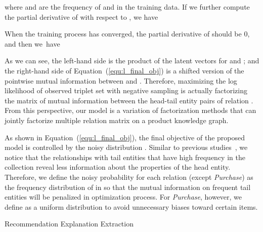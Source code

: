 \documentclass[algorithms,article,accept,moreauthors,pdftex,10pt,a4paper]{Definitions/mdpi}
\begin{document}
where  and  are the frequency of  and  in the training data.
If we further compute the partial derivative of  with respect to , we have


When the training process has converged, the partial derivative of  should be 0, and then we~have


As we can see, the left-hand side  is the product of the latent vectors for  and ; and the right-hand side of Equation~(\ref{equ:l_final_obj}) is a shifted version of the pointwise mutual information between  and .
Therefore, maximizing the log likelihood of observed triplet set  with negative sampling is actually factorizing the matrix of mutual information between the head-tail entity pairs  of relation .
From this perspective, our model is a variation of factorization methods that can jointly factorize multiple relation matrix on a product knowledge graph.


As shown in Equation~(\ref{equ:l_final_obj}), the final objective of the proposed model is controlled by the noisy distribution .
Similar to previous studies~\cite{mikolov2013efficient,le2014distributed,ai2016analysis}, we notice that the relationships with tail entities that have high frequency in the collection reveal less information about the properties of the head entity.
Therefore, we define the noisy probability  for each relation  (except \textit{Purchase}) as the frequency distribution of  in  so that the mutual information on frequent tail entities will be penalized in optimization process.
For \textit{Purchase}, however, we define  as a uniform distribution to avoid unnecessary biases toward certain items.\vspace{12 pt}

\begin{algorithm}[H]
	\small
	\caption{Recommendation Explanation Extraction}
	\SetAlgoLined
	\label{alg:REE}
	 
	\KwOut{}
\end{algorithm}
\end{document}
